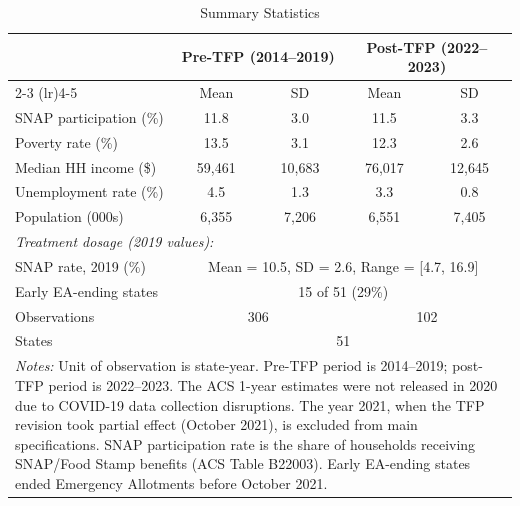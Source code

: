 \begin{table}[htbp]
\centering
\caption{Summary Statistics}
\label{tab:summary}
\begin{tabular}{lcccc}
\hline\hline
 & \multicolumn{2}{c}{Pre-TFP (2014--2019)} & \multicolumn{2}{c}{Post-TFP (2022--2023)} \\
\cmidrule(lr){2-3} \cmidrule(lr){4-5}
 & Mean & SD & Mean & SD \\
\hline
SNAP participation (\%) & 11.8 & 3.0 & 11.5 & 3.3 \\
Poverty rate (\%) & 13.5 & 3.1 & 12.3 & 2.6 \\
Median HH income (\$) & 59,461 & 10,683 & 76,017 & 12,645 \\
Unemployment rate (\%) & 4.5 & 1.3 & 3.3 & 0.8 \\
Population (000s) & 6,355 & 7,206 & 6,551 & 7,405 \\
\hline
\multicolumn{5}{l}{\textit{Treatment dosage (2019 values):}} \\
SNAP rate, 2019 (\%) & \multicolumn{4}{c}{Mean = 10.5, SD = 2.6, Range = [4.7, 16.9]} \\
Early EA-ending states & \multicolumn{4}{c}{15 of 51 (29\%)} \\
\hline
Observations & \multicolumn{2}{c}{306} & \multicolumn{2}{c}{102} \\
States & \multicolumn{4}{c}{51} \\
\hline\hline
\multicolumn{5}{p{0.9\textwidth}}{\footnotesize \textit{Notes:} Unit of observation is state-year. Pre-TFP period is 2014--2019; post-TFP period is 2022--2023. The ACS 1-year estimates were not released in 2020 due to COVID-19 data collection disruptions. The year 2021, when the TFP revision took partial effect (October 2021), is excluded from main specifications. SNAP participation rate is the share of households receiving SNAP/Food Stamp benefits (ACS Table B22003). Early EA-ending states ended Emergency Allotments before October 2021.} \\
\end{tabular}
\end{table}
